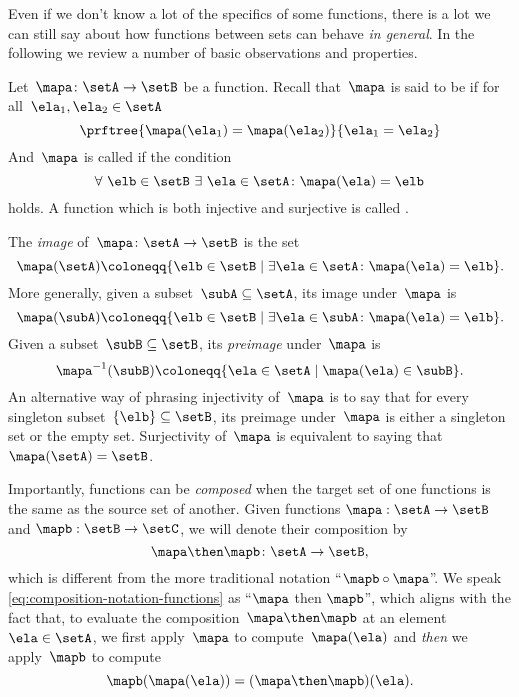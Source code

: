 Even if we don't know a lot of the specifics of some functions, there is a lot we can still say about how functions between sets can behave \emph{in general}. In the following we review a number of basic observations and properties.

Let~$\mapa\colon \setA \to \setB$ be a function.
Recall that~$\mapa$ is said to be \emph{} if for all~$\ela_1, \ela_2 \in \setA$
\begin{equation}
    \label{eq:injectivity-cond}
    \prftree{\mapa(\ela_1) = \mapa(\ela_2)}{\ela_1 = \ela_2}
\end{equation}
And~$\mapa$ is called \emph{} if the condition
\begin{equation}
    \label{eq:surjectivity-cond}
    \forall \ \elb \in \setB \ \exists \ \ela \in \setA \colon \mapa(\ela) = \elb
\end{equation}
holds. A function which is both injective and surjective is called \emph{}.

The \emph{image} of~$\mapa\colon \setA \to \setB$ is the set
\begin{equation}
    \mapa(\setA) \coloneqq \{ \elb \in \setB \mid \exists \ela \in \setA \colon \mapa(\ela) = \elb \}.
\end{equation}
More generally, given a subset~$\subA \subseteq \setA$, its image under~$\mapa$ is
\begin{equation*}
    \mapa(\subA) \coloneqq \{ \elb \in \setB \mid \exists \ela \in \subA \colon \mapa(\ela) = \elb \}.
\end{equation*}
Given a subset~$\subB \subseteq \setB$, its \emph{preimage} under~$\mapa$ is
\begin{equation*}
    \mapa^{-1}(\subB) \coloneqq \{ \ela \in \setA \mid  \mapa(\ela) \in \subB \}.
\end{equation*}
An alternative way of phrasing injectivity of~$\mapa$ is to say that for every singleton subset~$\{ \elb \} \subseteq \setB$, its preimage under~$\mapa$ is either a singleton set or the empty set.
Surjectivity of~$\mapa$ is equivalent to saying that~$\mapa(\setA) = \setB$.

Importantly, functions can be \emph{composed} when the target set of one functions is the same as the source set of another. Given functions $\mapa: \setA \to \setB$ and $\mapb : \setB \to \setC$, we will denote their composition by
\begin{equation}
    \label{eq:composition-notation-functions}
    \mapa \then \mapb \colon \setA \to \setB,
\end{equation}
which is different from the more traditional notation ``$\mapb \circ \mapa$''.
We speak \cref{eq:composition-notation-functions} as ``$\mapa$ then $\mapb$'', which aligns with the fact that, to evaluate the composition~$\mapa \then \mapb$ at an element~$\ela \in \setA$, we first apply~$\mapa$ to compute~$\mapa(\ela)$ and \emph{then} we apply~$\mapb$ to compute
\begin{equation*}
    \mapb(\mapa(\ela))=(\mapa \then \mapb)(\ela).
\end{equation*}

